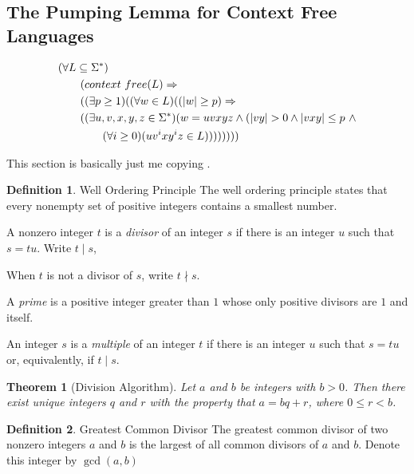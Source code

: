 \documentclass[../butidigress.tex]{subfiles}
\begin{document}
\subsection{The Pumping Lemma for Context Free Languages}
\begin{align*}
&(\forall L\subseteq \Sigma^{\ast}) \\
&\tab (context\ free(L) \Rightarrow \\
&\tab ((\exists p\geq 1)((\forall w\in L)((|w| \geq p) \Rightarrow \\
&\tab ((\exists u,v,x,y,z \in \Sigma^{\ast})(w=uvxyz \wedge (|vy| > 0 \wedge |vxy|\leq p\ \wedge \\
&\tab\tab (\forall i \geq 0)(uv^{i}xy^{i}z\in L))))))))
\end{align*}


\newtheorem{theorem}{Theorem}[subsection]
\newtheorem*{corollary}{Corollary}
\newtheorem{lemma}[theorem]{Lemma}

\theoremstyle{definition}
\newtheorem{definition}{Definition}[subsection]


This section is basically just me copying .

\begin{definition}{Well Ordering Principle}
The well ordering principle states that every nonempty set of positive integers contains a smallest number.
\end{definition}

A nonzero integer $t$ is a \emph{divisor} of an integer $s$ if there is an integer $u$ such that $s=tu$.
Write $t\mid s$, 

When $t$ is not a divisor of $s$, write $t\nmid s$.

A \emph{prime} is a positive integer greater than $1$ whose only positive divisors are $1$ and itself.

An integer $s$ is a \emph{multiple} of an integer $t$ if there is an integer $u$ such that $s=tu$ or, equivalently, if $t\mid s$.

\begin{theorem}[Division Algorithm]
Let $a$ and $b$ be integers with $b>0$.
Then there exist unique integers $q$ and $r$ with the property that $a=bq+r$, where $0\leq r<b$.
\end{theorem}

\begin{definition}{Greatest Common Divisor}
The greatest common divisor of two nonzero integers $a$ and $b$ is the largest of all common divisors of $a$ and $b$.
Denote this integer by $\gcd(a, b)$
\end{definition}
\end{document}
